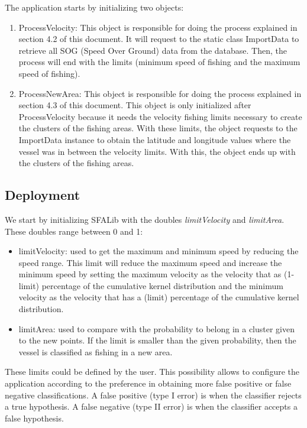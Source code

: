The application starts by initializing two objects:
\begin{enumerate}
\item ProcessVelocity: This object is responsible for doing the process explained in section 4.2 of this document. It will request to the static class ImportData to retrieve all SOG (Speed Over Ground) data from the database. Then, the process will end with the limits (minimum speed of fishing and the maximum speed of fishing).
\item ProcessNewArea: This object is responsible for doing the process explained in section 4.3 of this document. This object is only initialized after ProcessVelocity because it needs the velocity fishing limits necessary to create the clusters of the fishing areas. With these limits, the object requests to the ImportData instance to obtain the latitude and longitude values where the vessel was in between the velocity limits. With this, the object ends up with the clusters of the fishing areas.
\end{enumerate}



\subsection{Deployment} %
\label{sub:deployment}

We start by initializing SFALib with the doubles \emph{limitVelocity} and \emph{limitArea}. These doubles range between 0 and 1:
\begin{itemize}
\item limitVelocity: used to get the maximum and minimum speed by reducing the speed range. This limit will reduce the maximum speed and increase the minimum speed by setting the maximum velocity as the velocity that as (1-limit) percentage of the cumulative kernel distribution and the minimum velocity as the velocity that has a (limit) percentage of the cumulative kernel distribution.
\item limitArea: used to compare with the probability to belong in a cluster given to the new points. If the limit is smaller than the given probability, then the vessel is classified as fishing in a new area.
\end{itemize}
These limits could be defined by the user. This possibility allows to configure the application according to the preference in obtaining more false positive or false negative classifications.
A false positive (type I error) is when the classifier rejects a true hypothesis.
A false negative (type II error) is when the classifier accepts a false hypothesis.

